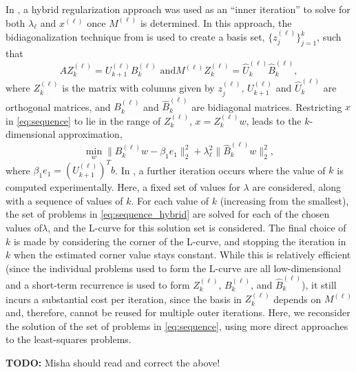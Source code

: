 In \cite{Gazzola_etal_2020}, a hybrid regularization approach
\cite{Kilmer_Hanson_Espanol_2007} was used as an ``inner iteration''
to solve for both $\lambda_\ell$ and $x^{(\ell)}$ once $M^{(\ell)}$ is
determined.  In this approach, the bidiagonalization technique from
\cite{Kilmer_Hanson_Espanol_2007} is used to create a basis set,
$\{z^{(\ell)}_j\}_{j=1}^k$, such that
\[
AZ_k^{(\ell)} = U_{k+1}^{(\ell)}B_k^{(\ell)} \text{ and
}M^{(\ell)}Z_k^{(\ell)} = \hat{U}_k^{(\ell)}\hat{B}_k^{(\ell)},
\]
where $Z_k^{(\ell)}$ is the matrix with columns given by
$z^{(\ell)}_j$, $U_{k+1}^{(\ell)}$ and $\hat{U}_k^{(\ell)}$ are
orthogonal matrices, and $B_k^{(\ell)}$ and $\hat{B}_k^{(\ell)}$ are
bidiagonal matrices.  Restricting $x$ in \eqref{eq:sequence} to lie in
the range of $Z_k^{(\ell)}$, $x = Z_k^{(\ell)}w$, leads to the
$k$-dimensional approximation,
\begin{equation}
  \label{eq:sequence_hybrid}
\min_{w} \| B_k^{(\ell)}w - \beta_1 e_1 \|_2^2 + \lambda_\ell^2 \| \hat{B}_k^{(\ell)} w \|_2^2,
\end{equation}
where $\beta_1 e_1 = \left(U_{k+1}^{(\ell)}\right)^Tb$.  In
\cite{Gazzola_etal_2020}, a further iteration occurs where the value
of $k$ is computed experimentally.  Here, a fixed set of values for
$\lambda$ are considered, along with a sequence of values of $k$.  For
each value of $k$ (increasing from the smallest), the set of problems
in \eqref{eq:sequence_hybrid} are solved for each of the chosen values
of$\lambda$, and the L-curve for this solution set is considered.  The
final choice of $k$ is made by considering the corner of the L-curve,
and stopping the iteration in $k$ when the estimated corner value
stays constant.  While this is relatively efficient (since the
individual problems used to form the L-curve are all low-dimensional
and a short-term recurrence is used to form $Z_k^{(\ell)}$,
$B_k^{(\ell)}$, and $\hat{B}_k^{(\ell)}$), it still incurs a
substantial cost per iteration, since the basis in $Z_k^{(\ell)}$
depends on $M^{(\ell)}$ and, therefore, cannot be reused for multiple
outer iterations.  Here, we reconsider the solution of the set of
problems in \eqref{eq:sequence}, using more direct approaches to the
least-squares problems.

{\bf TODO:} Misha should read and correct the above!

